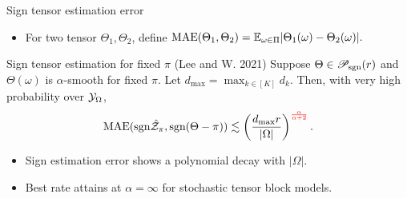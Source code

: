 \documentclass[10pt, mathserif]{beamer} %
\theoremstyle{definition}
\theoremstyle{plain}
\def\caliP{\mathscr{P}_{\textup{sgn}}}
\def\caliP{\mathscr{P}_{\textup{sgn}}}
\begin{document}
\begin{frame}{Sign tensor estimation error}
\begin{itemize}
\item For two tensor $\Theta_1,\Theta_2$, define $\textup{MAE}(\Theta_1,\Theta_2) = \mathbb{E}_{\omega\in\Pi}|\Theta_1(\omega)-\Theta_2(\omega)|.$
\end{itemize}
    \begin{block}{Sign tensor estimation for fixed $\pi$ (Lee and W. 2021)}
    Suppose $\Theta\in\caliP(r)$ and  $\Theta(\omega)$ is $\alpha$-smooth for fixed $\pi$. Let $d_{\max}=\max_{k\in[K]} d_k$. Then, with very high probability over $\mathcal{Y}_\Omega$, 
\begin{align}
\textup{MAE}(\text{sgn}\hat {\mathcal{Z}}_\pi, \text{sgn}(\Theta-\pi)) \lesssim  \left({d_{\max} r\over |\Omega|}\right)^{\color{red}\alpha\over \alpha+2}.
\end{align}
    \end{block}
    \begin{itemize}
    \item Sign estimation error shows a polynomial decay with $|\Omega|$. 
    \item Best rate attains at $\alpha=\infty$ for stochastic tensor block models. 
    \end{itemize}
\end{frame}
\end{document}
